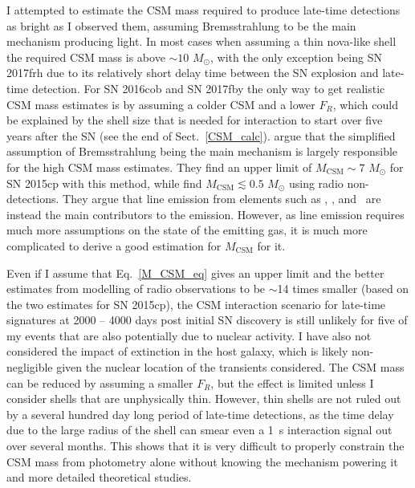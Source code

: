 \documentclass[a4paper,oneside,12pt, class=Latex/Classes/PhDthesisPSnPDF, crop=false]{standalone}
\begin{document}
I attempted to estimate the CSM mass required to produce late-time detections as bright as I observed them, assuming Bremsstrahlung to be the main mechanism producing light. In most cases when assuming a thin nova-like shell the required CSM mass is above $\sim 10$ $M_\odot$, with the only exception being SN 2017frh due to its relatively short delay time between the SN explosion and late-time detection. For SN 2016cob and SN 2017fby the only way to get realistic CSM mass estimates is by assuming a colder CSM and a lower $F_R$, which could be explained by the shell size that is needed for interaction to start over five years after the SN (see the end of Sect.~\ref{CSM_calc}). \citet{2015cp} argue that the simplified assumption of Bremsstrahlung being the main mechanism is largely responsible for the high CSM mass estimates. They find an upper limit of $M_\text{CSM} \sim 7$ $M_\odot$ for SN 2015cp with this method, while \citet{2015cp_radio} find $M_\text{CSM} \lesssim 0.5$ $M_\odot$ using radio non-detections. They argue that line emission from elements such as , , and ~are instead the main contributors to the emission. However, as line emission requires much more assumptions on the state of the emitting gas, it is much more complicated to derive a good estimation for $M_\text{CSM}$ for it. 

Even if I assume that Eq.~\ref{M_CSM_eq} gives an upper limit and the better estimates from modelling of radio observations to be $\sim$14 times smaller (based on the two estimates for SN 2015cp), the CSM interaction scenario for late-time signatures at 2000 -- 4000 days post initial SN discovery is still unlikely for five of my events that are also potentially due to nuclear activity. I have also not considered the impact of extinction in the host galaxy, which is likely non-negligible given the nuclear location of the transients considered. The CSM mass can be reduced by assuming a smaller $F_R$, but the effect is limited unless I consider shells that are unphysically thin. However, thin shells are not ruled out by a several hundred day long period of late-time detections, as the time delay due to the large radius of the shell can smear even a 1~s interaction signal out over several months. This shows that it is very difficult to properly constrain the CSM mass from photometry alone without knowing the mechanism powering it and more detailed theoretical studies.
\end{document}

